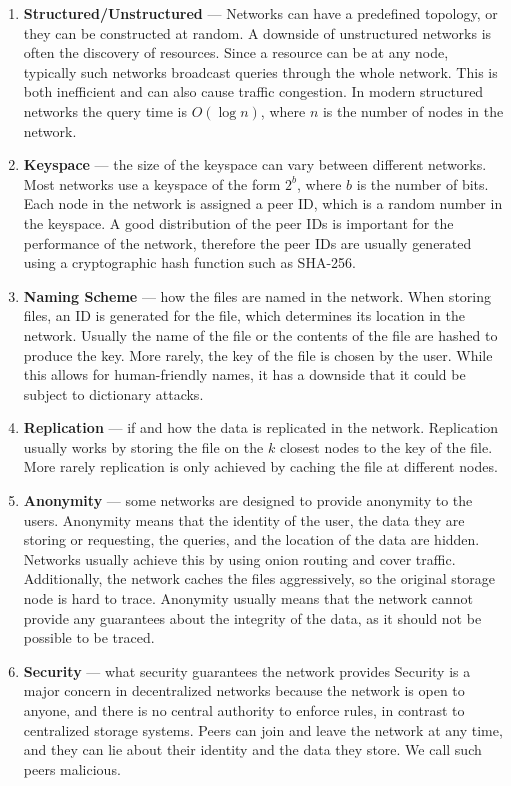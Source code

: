 \begin{enumerate}
    \item \textbf{Structured/Unstructured} --- Networks can have a predefined topology,
        or they can be constructed at random.
        A downside of unstructured networks is often the discovery of resources.
        Since a resource can be at any node,
        typically such networks broadcast queries through the whole network.
        This is both inefficient and can also cause traffic congestion.
        In modern structured networks the query time is $O(\log n)$,
        where $n$ is the number of nodes in the network.
    \item \textbf{Keyspace} --- the size of the keyspace can vary between different networks.
        Most networks use a keyspace of the form $2^b$, where $b$ is the number of bits.
        Each node in the network is assigned a peer ID, which is a random number in the keyspace.
        A good distribution of the peer IDs is important for the performance of the network,
        therefore the peer IDs are usually generated using a cryptographic hash function such as SHA-256.
    \item \textbf{Naming Scheme} --- how the files are named in the network.
        When storing files, an ID is generated for the file, which determines its location in the network.
        Usually the name of the file or the contents of the file are hashed to produce the key.
        More rarely, the key of the file is chosen by the user.
        While this allows for human-friendly names,
        it has a downside that it could be subject to dictionary attacks.
    \item \textbf{Replication} --- if and how the data is replicated in the network.
        Replication usually works by storing the file on the $k$ closest nodes to the key of the file.
        More rarely replication is only achieved by caching the file at different nodes.
    \item \textbf{Anonymity} --- some networks are designed to provide anonymity to the users.
        Anonymity means that the identity of the user, the data they are storing or requesting,
        the queries, and the location of the data are hidden.
        Networks usually achieve this by using onion routing and cover traffic.
        Additionally, the network caches the files aggressively,
        so the original storage node is hard to trace.
        Anonymity usually means that the network cannot provide any guarantees about
        the integrity of the data, as it should not be possible to be traced.
    \item \textbf{Security} --- what security guarantees the network provides
        Security is a major concern in decentralized networks because
        the network is open to anyone, and there is no central authority to enforce rules,
        in contrast to centralized storage systems.
        Peers can join and leave the network at any time, and they can lie about their identity and the data they store.
        We call such peers malicious.


\end{enumerate}
